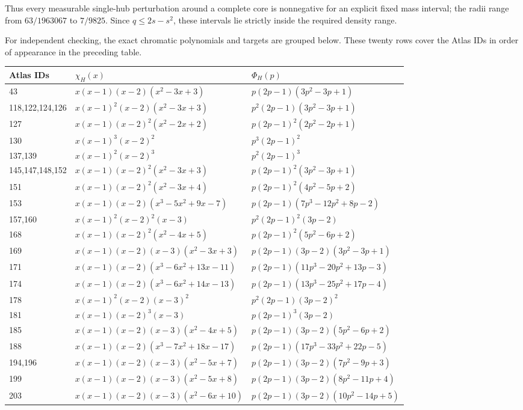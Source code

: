 \documentclass[11pt]{article}
\begin{document}
Thus every measurable single-hub perturbation around a complete core is
nonnegative for an explicit fixed mass interval; the radii range from
$63/1963067$ to $7/9825$.  Since $q\leq2s-s^2$, these intervals lie strictly
inside the required density range.

For independent checking, the exact chromatic polynomials and targets are
grouped below.  These twenty rows cover the Atlas IDs in order of appearance
in the preceding table.

\scriptsize
\begin{longtable}{l@{\quad}p{6.6cm}p{6.6cm}}
Atlas IDs&$\chi_H(x)$&$\Phi_H(p)$\\ \hline
43&$x(x-1)(x-2)(x^2-3x+3)$&$p(2p-1)(3p^2-3p+1)$\\
118,122,124,126&$x(x-1)^2(x-2)(x^2-3x+3)$&$p^2(2p-1)(3p^2-3p+1)$\\
127&$x(x-1)(x-2)^2(x^2-2x+2)$&$p(2p-1)^2(2p^2-2p+1)$\\
130&$x(x-1)^3(x-2)^2$&$p^3(2p-1)^2$\\
137,139&$x(x-1)^2(x-2)^3$&$p^2(2p-1)^3$\\
145,147,148,152&$x(x-1)(x-2)^2(x^2-3x+3)$&$p(2p-1)^2(3p^2-3p+1)$\\
151&$x(x-1)(x-2)^2(x^2-3x+4)$&$p(2p-1)^2(4p^2-5p+2)$\\
153&$x(x-1)(x-2)(x^3-5x^2+9x-7)$&$p(2p-1)(7p^3-12p^2+8p-2)$\\
157,160&$x(x-1)^2(x-2)^2(x-3)$&$p^2(2p-1)^2(3p-2)$\\
168&$x(x-1)(x-2)^2(x^2-4x+5)$&$p(2p-1)^2(5p^2-6p+2)$\\
169&$x(x-1)(x-2)(x-3)(x^2-3x+3)$&$p(2p-1)(3p-2)(3p^2-3p+1)$\\
171&$x(x-1)(x-2)(x^3-6x^2+13x-11)$&$p(2p-1)(11p^3-20p^2+13p-3)$\\
174&$x(x-1)(x-2)(x^3-6x^2+14x-13)$&$p(2p-1)(13p^3-25p^2+17p-4)$\\
178&$x(x-1)^2(x-2)(x-3)^2$&$p^2(2p-1)(3p-2)^2$\\
181&$x(x-1)(x-2)^3(x-3)$&$p(2p-1)^3(3p-2)$\\
185&$x(x-1)(x-2)(x-3)(x^2-4x+5)$&$p(2p-1)(3p-2)(5p^2-6p+2)$\\
188&$x(x-1)(x-2)(x^3-7x^2+18x-17)$&$p(2p-1)(17p^3-33p^2+22p-5)$\\
194,196&$x(x-1)(x-2)(x-3)(x^2-5x+7)$&$p(2p-1)(3p-2)(7p^2-9p+3)$\\
199&$x(x-1)(x-2)(x-3)(x^2-5x+8)$&$p(2p-1)(3p-2)(8p^2-11p+4)$\\
203&$x(x-1)(x-2)(x-3)(x^2-6x+10)$&$p(2p-1)(3p-2)(10p^2-14p+5)$
\end{longtable}
\normalsize
\end{document}
